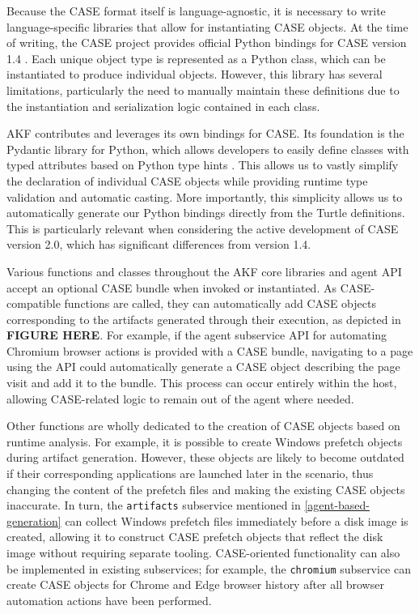 Because the CASE format itself is language-agnostic, it is necessary to
write language-specific libraries that allow for instantiating CASE
objects. At the time of writing, the CASE project provides official
Python bindings for CASE version 1.4
\cite{CaseworkCASEMappingPython}. Each unique object type is
represented as a Python class, which can be instantiated to produce
individual objects. However, this library has several limitations,
particularly the need to manually maintain these definitions due to the
instantiation and serialization logic contained in each class.

AKF contributes and leverages its own bindings for CASE. Its foundation
is the Pydantic library for Python, which allows developers to easily
define classes with typed attributes based on Python type hints
\cite{colvinPydantic2024}. This allows us to vastly simplify the
declaration of individual CASE objects while providing runtime type
validation and automatic casting. More importantly, this simplicity
allows us to automatically generate our Python bindings directly from
the Turtle definitions. This is particularly relevant when considering
the active development of CASE version 2.0, which has significant
differences from version 1.4.

Various functions and classes throughout the AKF core libraries and
agent API accept an optional CASE bundle when invoked or instantiated.
As CASE-compatible functions are called, they can automatically add CASE
objects corresponding to the artifacts generated through their
execution, as depicted in \textbf{FIGURE HERE}. For example, if the
agent subservice API for automating Chromium browser actions is provided
with a CASE bundle, navigating to a page using the API could
automatically generate a CASE object describing the page visit and add
it to the bundle. This process can occur entirely within the host,
allowing CASE-related logic to remain out of the agent where needed.

Other functions are wholly dedicated to the creation of CASE objects
based on runtime analysis. For example, it is possible to create Windows
prefetch objects during artifact generation. However, these objects are
likely to become outdated if their corresponding applications are
launched later in the scenario, thus changing the content of the
prefetch files and making the existing CASE objects inaccurate. In turn,
the \passthrough{\lstinline!artifacts!} subservice mentioned in
\autoref{agent-based-generation} can collect Windows prefetch
files immediately before a disk image is created, allowing it to
construct CASE prefetch objects that reflect the disk image without
requiring separate tooling. CASE-oriented functionality can also be
implemented in existing subservices; for example, the
\passthrough{\lstinline!chromium!} subservice can create CASE objects
for Chrome and Edge browser history after all browser automation actions
have been performed.

